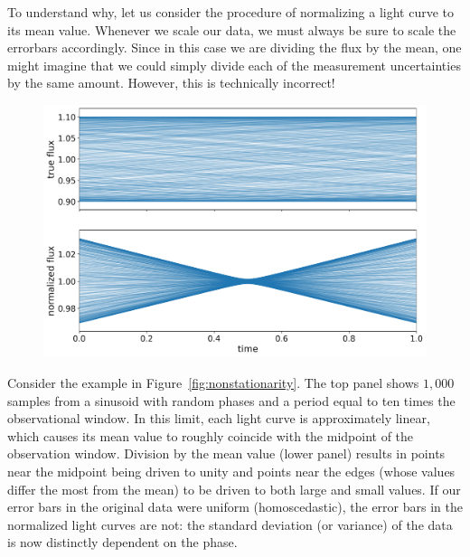 \documentclass[modern,linenumbers]{aastex62}
\begin{document}
To understand why, let us consider the procedure of normalizing a light curve
to its mean value. Whenever we scale our data, we must always be sure to
scale the errorbars accordingly. Since in this case we are dividing the
flux by the mean, one might imagine that we could simply divide each of
the measurement uncertainties by the same amount. However,
this is technically incorrect!

\begin{figure}[t!]
    \begin{centering}
        \includegraphics[width=\linewidth]{figures/nonstationarity.pdf}
    \end{centering}
\end{figure}

Consider the example in Figure~\ref{fig:nonstationarity}. The top panel
shows $1{,}000$ samples from a sinusoid with random phases and a period
equal to ten times the observational window.
%
In this limit, each light curve is approximately
linear, which causes its mean value to roughly coincide with the midpoint of the
observation window.
%
Division by the mean value (lower panel) results in points near the
midpoint being driven to unity and points near the edges (whose values differ
the most from the mean) to be driven to both large and small values.
%
If our error bars in the original data were uniform (homoscedastic),
the error bars in the normalized light curves are
not: the standard deviation (or variance) of the data is now
distinctly dependent on the phase.
\end{document}
